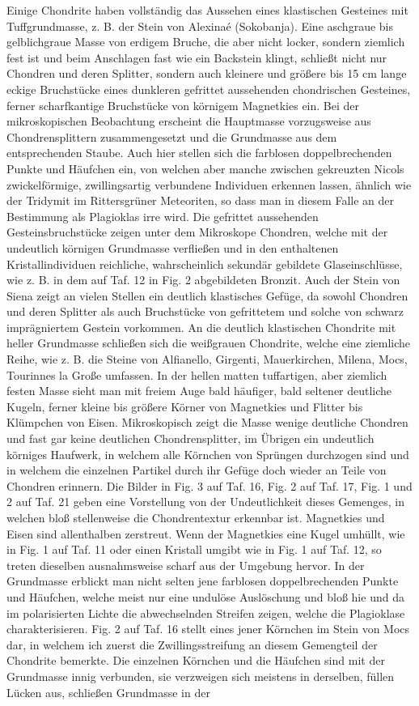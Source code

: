 \documentclass[a4paper, 11pt, oneside, polutonikogreek, german]{article}
\begin{document}
Einige Chondrite haben vollständig das Aussehen eines klastischen Gesteines mit Tuffgrundmasse, z. B. der Stein von Alexinaé (Sokobanja). Eine aschgraue bis gelblichgraue Masse von erdigem Bruche, die aber nicht locker, sondern ziemlich fest ist und beim Anschlagen fast wie ein Backstein klingt, schließt nicht nur Chondren und deren Splitter, sondern auch kleinere und größere bis 15 cm lange eckige Bruchstücke eines dunkleren gefrittet aussehenden chondrischen Gesteines, ferner scharfkantige Bruchstücke von körnigem Magnetkies ein. Bei der mikroskopischen Beobachtung erscheint die Hauptmasse vorzugsweise aus Chondrensplittern zusammengesetzt und die Grundmasse aus dem entsprechenden Staube. Auch hier stellen sich die farblosen doppelbrechenden Punkte und Häufchen ein, von welchen aber manche zwischen gekreuzten Nicols zwickelförmige, zwillingsartig verbundene Individuen erkennen lassen, ähnlich wie der Tridymit im Rittersgrüner Meteoriten, so dass man in diesem Falle an der Bestimmung als Plagioklas irre wird. Die gefrittet aussehenden Gesteinsbruchstücke zeigen unter dem Mikroskope Chondren, welche mit der undeutlich körnigen Grundmasse verfließen und in den enthaltenen Kristallindividuen reichliche, wahrscheinlich sekundär gebildete Glaseinschlüsse, wie z. B. in dem auf Taf. 12 in Fig. 2 abgebildeten Bronzit. Auch der Stein von Siena zeigt an vielen Stellen ein deutlich klastisches Gefüge, da sowohl Chondren und deren Splitter als auch Bruchstücke von gefrittetem und solche von schwarz imprägniertem Gestein vorkommen. An die deutlich klastischen Chondrite mit heller Grundmasse schließen sich die weißgrauen Chondrite, welche eine ziemliche Reihe, wie z. B. die Steine von Alfianello, Girgenti, Mauerkirchen, Milena, Mocs, Tourinnes la Große umfassen. In der hellen matten tuffartigen, aber ziemlich festen Masse sieht man mit freiem Auge bald häufiger, bald seltener deutliche Kugeln, ferner kleine bis größere Körner von Magnetkies und Flitter bis Klümpchen von Eisen. Mikroskopisch zeigt die Masse wenige deutliche Chondren und fast gar keine deutlichen Chondrensplitter, im Übrigen ein undeutlich körniges Haufwerk, in welchem alle Körnchen von Sprüngen durchzogen sind und in welchem die einzelnen Partikel durch ihr Gefüge doch wieder an Teile von Chondren erinnern. Die Bilder in Fig. 3 auf Taf. 16, Fig. 2 auf Taf. 17, Fig. 1 und 2 auf Taf. 21 geben eine Vorstellung von der Undeutlichkeit dieses Gemenges, in welchen bloß stellenweise die Chondrentextur erkennbar ist. Magnetkies und Eisen sind allenthalben zerstreut. Wenn der Magnetkies eine Kugel umhüllt, wie in Fig. 1 auf Taf. 11 oder einen Kristall umgibt wie in Fig. 1 auf Taf. 12, so treten dieselben ausnahmsweise scharf aus der Umgebung hervor. In der Grundmasse erblickt man nicht selten jene farblosen doppelbrechenden Punkte und Häufchen, welche meist nur eine undulöse Auslöschung und bloß hie und da im polarisierten Lichte die abwechselnden Streifen zeigen, welche die Plagioklase charakterisieren. Fig. 2 auf Taf. 16 stellt eines jener Körnchen im Stein von Mocs dar, in welchem ich zuerst die Zwillingsstreifung an diesem Gemengteil der Chondrite bemerkte. Die einzelnen Körnchen und die Häufchen sind mit der Grundmasse innig verbunden, sie verzweigen sich meistens in derselben, füllen Lücken aus, schließen Grundmasse in der 
\end{document}
